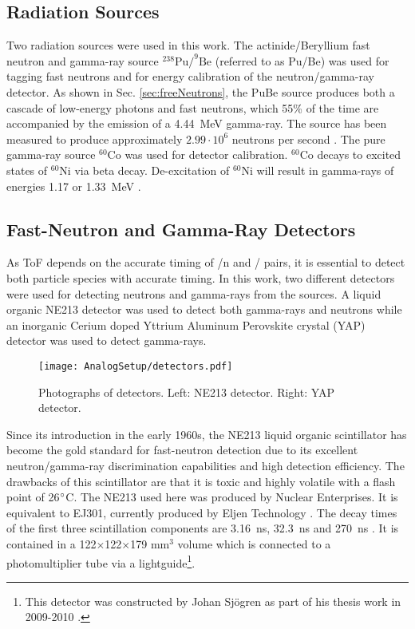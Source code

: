 \documentclass[main.tex]{subfiles}
\begin{document}
\subsection{Radiation Sources}
Two radiation sources were used in this work. The actinide/Beryllium fast neutron and gamma-ray source $^\text{238}\text{Pu}/^\text{9}\text{Be}$ (referred to as Pu/Be) was used for tagging fast neutrons and for energy calibration of the neutron/gamma-ray detector. As shown in Sec. \ref{sec:freeNeutrons}, the PuBe source produces both a cascade of low-energy photons and fast neutrons, which 55\% of the time are accompanied by the emission of a \SI{4.44}{\MeV} gamma-ray. The source has been measured to produce approximately $\text{2.99}\cdot\text{10}^\text{6}$ neutrons per second \cite{Scherzinger:2017}. The pure gamma-ray source $^\text{60}\text{Co}$ was used for detector calibration. $^\text{60}\text{Co}$ decays to excited states of $^\text{60}\text{Ni}$ via beta decay. De-excitation of $^\text{60}\text{Ni}$ will result in gamma-rays of energies 1.17 or \SI{1.33}{MeV} \cite{Nudat}.



\subsection{Fast-Neutron and Gamma-Ray Detectors}
As ToF depends on the accurate timing of \textgamma /n and \textgamma /\textgamma\; pairs, it is essential to detect both particle species with accurate timing. In this work, two different detectors were used for detecting neutrons and gamma-rays from the sources. A liquid organic NE213 detector was used to detect both gamma-rays and neutrons while an inorganic Cerium doped Yttrium Aluminum Perovskite crystal (YAP) detector was used to detect gamma-rays. 

\begin{figure}[h]
    \centering
        \texttt{[image: AnalogSetup/detectors.pdf]}
        \caption[Photographs of detectors]{Photographs of detectors. Left: NE213 detector. Right: YAP detector.}
    \label{fig:detectors}
\end{figure}

Since its introduction in the early 1960s, the NE213 liquid organic scintillator has become the gold standard for fast-neutron detection due to its excellent neutron/gamma-ray discrimination capabilities and high detection efficiency. 
The drawbacks of this scintillator are that it is toxic and highly volatile with a flash point of 26$\text{\degree}$C. The NE213 used here was produced by Nuclear Enterprises. It is equivalent to EJ301, currently produced by Eljen Technology \cite{Eljen}. The decay times of the first three scintillation components are \SI{3.16}{ns}, \SI{32.3}{ns} and \SI{270}{ns} \cite{Eljen}. It is contained in a 122$\times$122$\times$179 \si{\mm}$^\text{3}$ volume which is connected to a photomultiplier tube via a lightguide\footnote{This detector was constructed by Johan Sjögren as part of his thesis work in 2009-2010 \cite{sjogren}.}.
\end{document}
